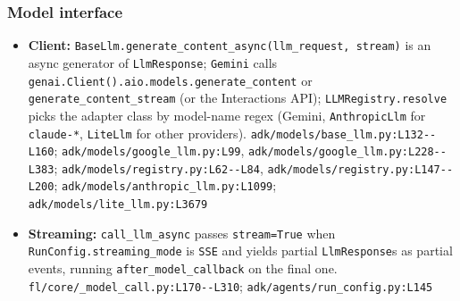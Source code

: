 \subsubsection*{Model interface}
\begin{itemize}
\item \textbf{Client:} \texttt{BaseLlm.\allowbreak{}generate\_\allowbreak{}content\_\allowbreak{}async(\allowbreak{}llm\_\allowbreak{}request, stream)} is an async generator of \texttt{LlmResponse}; \texttt{Gemini} calls \texttt{genai.\allowbreak{}Client(\allowbreak{}).\allowbreak{}aio.\allowbreak{}models.\allowbreak{}generate\_\allowbreak{}content} or \texttt{generate\_\allowbreak{}content\_\allowbreak{}stream} (or the Interactions API); \texttt{LLMRegistry.\allowbreak{}resolve} picks the adapter class by model-name regex (Gemini, \texttt{AnthropicLlm} for \texttt{claude-\allowbreak{}*}, \texttt{LiteLlm} for other providers). \texttt{adk/\allowbreak{}models/\allowbreak{}base\_\allowbreak{}llm.\allowbreak{}py:\allowbreak{}L132-\allowbreak{}-\allowbreak{}L160}; \texttt{adk/\allowbreak{}models/\allowbreak{}google\_\allowbreak{}llm.\allowbreak{}py:\allowbreak{}L99}, \texttt{adk/\allowbreak{}models/\allowbreak{}google\_\allowbreak{}llm.\allowbreak{}py:\allowbreak{}L228-\allowbreak{}-\allowbreak{}L383}; \texttt{adk/\allowbreak{}models/\allowbreak{}registry.\allowbreak{}py:\allowbreak{}L62-\allowbreak{}-\allowbreak{}L84}, \texttt{adk/\allowbreak{}models/\allowbreak{}registry.\allowbreak{}py:\allowbreak{}L147-\allowbreak{}-\allowbreak{}L200}; \texttt{adk/\allowbreak{}models/\allowbreak{}anthropic\_\allowbreak{}llm.\allowbreak{}py:\allowbreak{}L1099}; \texttt{adk/\allowbreak{}models/\allowbreak{}lite\_\allowbreak{}llm.\allowbreak{}py:\allowbreak{}L3679}
\item \textbf{Streaming:} \texttt{call\_\allowbreak{}llm\_\allowbreak{}async} passes \texttt{stream=True} when \texttt{RunConfig.\allowbreak{}streaming\_\allowbreak{}mode} is \texttt{SSE} and yields partial \texttt{LlmResponse}s as partial events, running \texttt{after\_\allowbreak{}model\_\allowbreak{}callback} on the final one. \texttt{fl/\allowbreak{}core/\allowbreak{}\_\allowbreak{}model\_\allowbreak{}call.\allowbreak{}py:\allowbreak{}L170-\allowbreak{}-\allowbreak{}L310}; \texttt{adk/\allowbreak{}agents/\allowbreak{}run\_\allowbreak{}config.\allowbreak{}py:\allowbreak{}L145}

\end{itemize}
